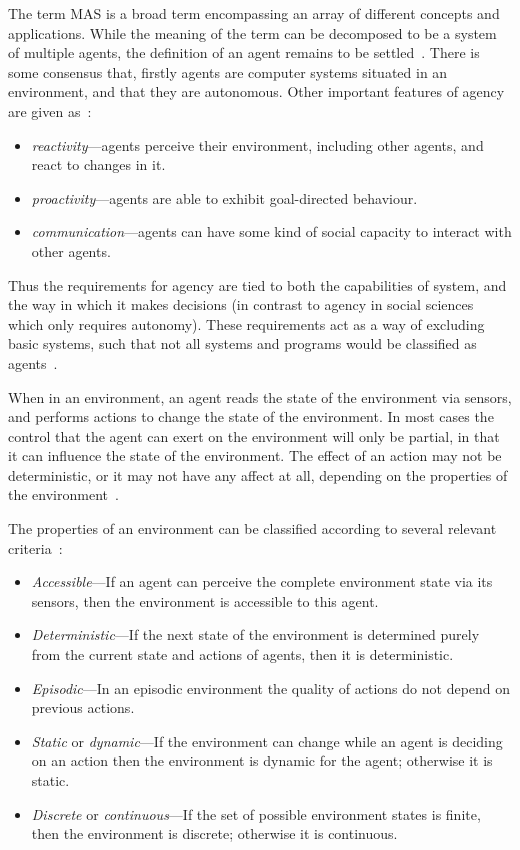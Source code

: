 The term \ac{MAS} is a broad term encompassing an array of different concepts and applications. While the meaning of the term can be decomposed to be a system of multiple agents, the definition of an agent remains to be settled~\citep{Wooldridge2002}. There is some consensus that, firstly agents are computer systems situated in an environment, and that they are autonomous. Other important features of agency are given as~\citep{Wooldridge1995,HayesRoth1995}:
\begin{itemize}
\item \emph{reactivity}---agents perceive their environment, including other agents, and react to changes in it.
\item \emph{proactivity}---agents are able to exhibit goal-directed behaviour.
\item \emph{communication}---agents can have some kind of social capacity to interact with other agents.
\end{itemize}

Thus the requirements for agency are tied to both the capabilities of system, and the way in which it makes decisions (in contrast to agency in social sciences which only requires autonomy). These requirements act as a way of excluding basic systems, such that not all systems and programs would be classified as agents~\citep{Franklin1997}.

When in an environment, an agent reads the state of the environment via sensors, and performs actions to change the state of the environment. In most cases the control that the agent can exert on the environment will only be partial, in that it can influence the state of the environment. The effect of an action may not be deterministic, or it may not have any affect at all, depending on the properties of the environment~\citep{Wooldridge2002}.

The properties of an environment can be classified according to several relevant criteria~\citep[p.46]{Russell2003}:
\begin{itemize}
\item \emph{Accessible}---If an agent can perceive the complete environment state via its sensors, then the environment is accessible to this agent.
\item \emph{Deterministic}---If the next state of the environment is determined purely from the current state and actions of agents, then it is deterministic.
\item \emph{Episodic}---In an episodic environment the quality of actions do not depend on previous actions.
\item \emph{Static} or \emph{dynamic}---If the environment can change while an agent is deciding on an action then the environment is dynamic for the agent; otherwise it is static.
\item \emph{Discrete} or \emph{continuous}---If the set of possible environment states is finite, then the environment is discrete; otherwise it is continuous.
\end{itemize}


